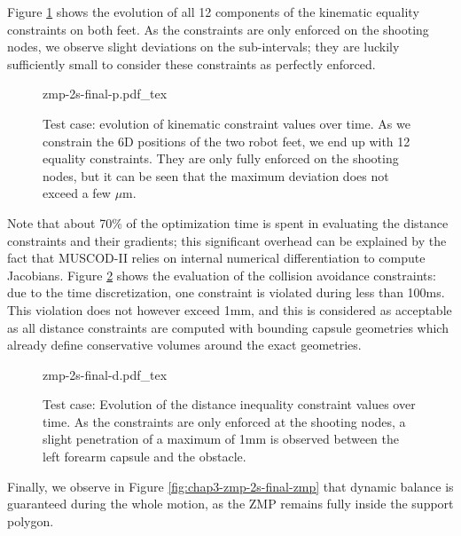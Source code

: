 Figure \ref{fig:chap3-zmp-2s-final-p} shows the evolution of all 12
components of the kinematic equality constraints on both feet. As the
constraints are only enforced on the shooting nodes, we observe slight
deviations on the sub-intervals; they are luckily sufficiently small
to consider these constraints as perfectly enforced.

\begin{figure}
  \centering
      {\def\svgwidth{0.8\linewidth}
        {\scriptsize
          
                     {zmp-2s-final-p.pdf_tex}
        }
      }
  \caption{Test case: evolution of kinematic constraint values over
    time. As we constrain the 6D positions of the two robot feet, we
    end up with 12 equality constraints. They are only fully enforced
    on the shooting nodes, but it can be seen that the maximum
    deviation does not exceed a few $\mu$m.}
  \label{fig:chap3-zmp-2s-final-p}
\end{figure}

Note that about 70\% of the optimization time is spent in evaluating
the distance constraints and their gradients; this significant
overhead can be explained by the fact that \textsc{MUSCOD-II} relies
on internal numerical differentiation to compute Jacobians. Figure
\ref{fig:chap3-zmp-2s-final-d} shows the evaluation of the collision
avoidance constraints: due to the time discretization, one constraint
is violated during less than 100ms. This violation does not however
exceed 1mm, and this is considered as acceptable as all distance
constraints are computed with bounding capsule geometries which
already define conservative volumes around the exact geometries.

\begin{figure}
  \centering
      {\def\svgwidth{0.8\linewidth}
        {\scriptsize
          
                     {zmp-2s-final-d.pdf_tex}
        }
      }
  \caption{Test case: Evolution of the distance inequality constraint
    values over time. As the constraints are only enforced at the
    shooting nodes, a slight penetration of a maximum of 1mm is
    observed between the left forearm capsule and the obstacle.}
  \label{fig:chap3-zmp-2s-final-d}
\end{figure}

Finally, we observe in Figure \ref{fig:chap3-zmp-2s-final-zmp} that
dynamic balance is guaranteed during the whole motion, as the ZMP
remains fully inside the support polygon.

